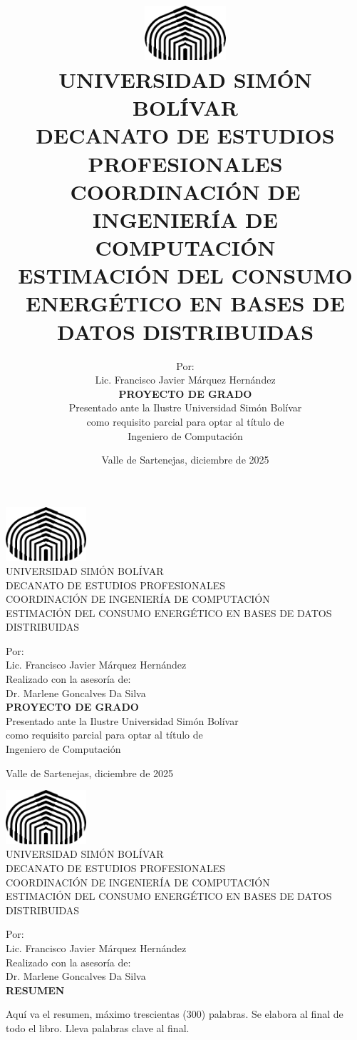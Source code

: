 \documentclass[12pt, letter paper]{report}
\title{
  \includegraphics[height = 2cm]{images/logo.png}\\
  {\small UNIVERSIDAD SIMÓN BOLÍVAR\\
  DECANATO DE ESTUDIOS PROFESIONALES\\
  COORDINACIÓN DE INGENIERÍA DE COMPUTACIÓN}\vspace{3cm}\\
  ESTIMACIÓN DEL CONSUMO ENERGÉTICO EN BASES DE DATOS DISTRIBUIDAS\vspace{3cm}
}
\author{
  Por:\\
  Lic. Francisco Javier Márquez Hernández\vspace{1.5cm}\\
  \textbf{PROYECTO DE GRADO}\\
  Presentado ante la Ilustre Universidad Simón Bolívar\\
  como requisito parcial para optar al título de\\
  Ingeniero de Computación\\\vspace{0.5cm}
}
\date{Valle de Sartenejas, diciembre de 2025}
\begin{document}
  \maketitle
  {
    \centering
    \includegraphics[height = 2cm]{images/logo.png}\\
    UNIVERSIDAD SIMÓN BOLÍVAR\\
    DECANATO DE ESTUDIOS PROFESIONALES\\
    COORDINACIÓN DE INGENIERÍA DE COMPUTACIÓN\vspace{3.5cm}\\
    \LARGE ESTIMACIÓN DEL CONSUMO ENERGÉTICO EN BASES DE DATOS DISTRIBUIDAS
    \vspace{3.5cm}
  
    \large Por:\\
    Lic. Francisco Javier Márquez Hernández\vspace{1.7cm}\\
    Realizado con la asesoría de:\\
    Dr. Marlene Goncalves Da Silva\vspace{1.7cm}\\
    \textbf{PROYECTO DE GRADO}\\
    Presentado ante la Ilustre Universidad Simón Bolívar\\
    como requisito parcial para optar al título de\\
    Ingeniero de Computación\\\vspace{1.7cm}
  
    Valle de Sartenejas, diciembre de 2025
  
    \includegraphics[height = 2cm]{images/logo.png}\\
    UNIVERSIDAD SIMÓN BOLÍVAR\\
    DECANATO DE ESTUDIOS PROFESIONALES\\
    COORDINACIÓN DE INGENIERÍA DE COMPUTACIÓN\vspace{3.5cm}\\
    \LARGE ESTIMACIÓN DEL CONSUMO ENERGÉTICO EN BASES DE DATOS DISTRIBUIDAS
    \vspace{3.5cm}
  
    \large Por:\\
    Lic. Francisco Javier Márquez Hernández\vspace{1.7cm}\\
    Realizado con la asesoría de:\\
    Dr. Marlene Goncalves Da Silva\vspace{1.7cm}\\
    \textbf{RESUMEN}\\
  }
  Aquí va el resumen, máximo trescientas (300) palabras. Se elabora al final de
  todo el libro. Lleva palabras clave al final.
\end{document}
